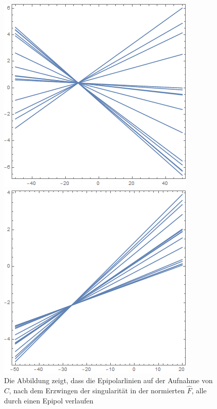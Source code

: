 

\begin{figure}[!htb]
	\includegraphics[width=\linewidth]{images/L_PC1_F_Constraint.png}
	\caption[Epipolarlinien in $C$ aus singulärer Fundamentalmatrix]{Die Abbildung zeigt, dass die Epipolarlinien auf der Aufnahme von $C$, nach dem Erzwingen der singularität in der normierten $\hat{F}$, alle durch einen Epipol verlaufen}
	\label{fig:EpipoleWithF1}
	\endminipage\hfill
	\includegraphics[width=\linewidth]{images/LPrime_PC2_F_Constraint.png}

\end{figure}
